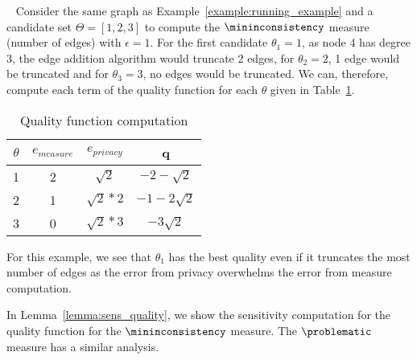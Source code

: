 \begin{example}~\label{example:quality_function}
    Consider the same graph as Example~\ref{example:running_example} and a candidate set $\Theta = [1, 2, 3]$ to compute the $\mininconsistency$ measure (number of edges) with $\epsilon=1$. For the first candidate $\theta_1 = 1$, as node 4 has degree 3, the edge addition algorithm would truncate 2 edges, for $\theta_2 = 2$, 1 edge would be truncated and for $\theta_3 = 3$, no edges would be truncated. We can, therefore, compute each term of the quality function for each $\theta$ given in Table~\ref{tab:example_quality_function}.  
    \begin{table}[]
        \centering
        \begin{tabular}{|c|c|c|c|}
             \hline
             $\theta$ & $e_{measure}$ & $e_{privacy}$ & q  \\
             \hline
             1 & 2 & $\sqrt{2}$ & $-2 - \sqrt{2}$\\
             2 & 1 & $\sqrt{2} * 2$ &  $-1 - 2\sqrt{2}$\\
             3 & 0 & $\sqrt{2} * 3$ & $-3\sqrt{2}$\\
             \hline
        \end{tabular}
        \caption{Quality function computation}
        \label{tab:example_quality_function}
    \end{table}
    For this example, we see that $\theta_1$ has the best quality even if it truncates the most number of edges as the error from privacy overwhelms the error from measure computation. 
\end{example}

In Lemma~\ref{lemma:sens_quality}, we show the sensitivity computation for the quality function for the $\mininconsistency$ measure. The $\problematic$ measure has a similar analysis. 

